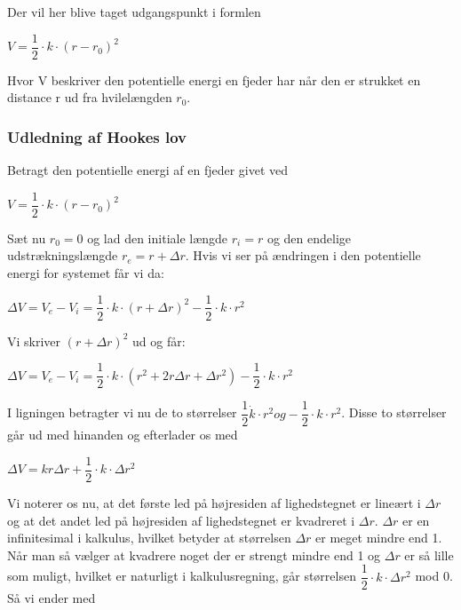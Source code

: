 \documentclass[12pt,a4paper]{article}
\theoremstyle{break}
\theoremstyle{nonumberplain}
\begin{document}
Der vil her blive taget udgangspunkt i formlen 
\begin{center}
$V=\dfrac{1}{2} \cdot k \cdot (r-r_{0})^2$
\end{center}

Hvor V beskriver den potentielle energi en fjeder har når den er strukket en distance r ud fra hvilelængden $r_0$. 

\subsubsection{Udledning af Hookes lov}
Betragt den potentielle energi af en fjeder givet ved

\begin{center}
$V=\dfrac{1}{2} \cdot k \cdot (r-r_{0})^2$
\end{center}

Sæt nu $r_0 = 0$ og lad den initiale længde $r_i = r$ og den endelige udstrækningslængde $r_e = r + \Delta r$. Hvis vi ser på ændringen i den potentielle energi for systemet får vi da:

\begin{center}
$\Delta V = V_e - V_i = \dfrac{1}{2} \cdot k \cdot (r+ \Delta r)^2 - \dfrac{1}{2} \cdot k \cdot r^2$ 
\end{center}

Vi skriver $(r + \Delta r)^2$ ud og får:

\begin{center}
$\Delta V = V_e - V_i = \dfrac{1}{2} \cdot k \cdot (r^2 + 2r \Delta r + \Delta r^2) - \dfrac{1}{2} \cdot k \cdot r^2$ 
\end{center}

I ligningen betragter vi nu de to størrelser $\dfrac{1}{2} \dot k \cdot r^2 og - \dfrac{1}{2} \cdot k \cdot r^2$. Disse to størrelser går ud med hinanden og efterlader os med

\begin{center}
$\Delta V = kr \Delta r + \dfrac{1}{2} \cdot k \cdot \Delta r^2$
\end{center}

Vi noterer os nu, at det første led på højresiden af lighedstegnet er lineært i $\Delta r$ og at det andet led på højresiden af lighedstegnet er kvadreret i $\Delta r$. $\Delta r$ er en infinitesimal i kalkulus, hvilket betyder at størrelsen $\Delta r$ er meget mindre end 1. Når man så vælger at kvadrere noget der er strengt mindre end 1 og $\Delta r$ er så lille som muligt, hvilket er naturligt i kalkulusregning, går størrelsen $\dfrac{1}{2} \cdot k \cdot \Delta r^2$ mod 0. Så vi ender med
\end{document}
